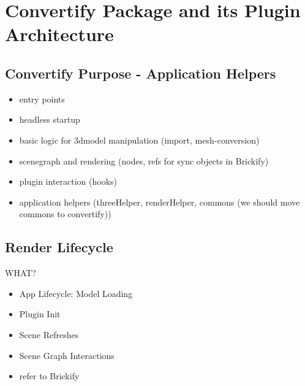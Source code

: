 \documentclass[../ClassicThesis.tex]{subfiles}
\begin{document}


\section{Convertify Package and its Plugin Architecture}


\subsection{Convertify Purpose - Application Helpers}

\begin{itemize}
\item entry points
\item headless startup
\item basic logic for 3dmodel manipulation (import, mesh-conversion)
\item scenegraph and rendering (nodes, refs for sync objects in Brickify)
\item plugin interaction (hooks)
\item application helpers (threeHelper, renderHelper, commons (we should move
  commons to convertify))
\end{itemize}

\subsection{Render Lifecycle}

WHAT?

\begin{itemize}
\item App Lifecycle: Model Loading
\item Plugin Init
\item Scene Refreshes
\item Scene Graph Interactions
\item refer to Brickify
\end{itemize}
\end{document}
